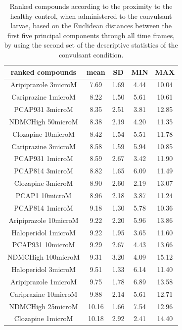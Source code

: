 \documentclass[a4paper,12pt]{article}
\begin{document}
\begin{table}[h!]\tiny
\centering
\caption{Ranked compounds according to the proximity to the healthy control, when administered to the convulsant larvae, based on the Euclidean distances between the first five principal components through all time frames, by using the second set of the descriptive statistics of the convulsant condition.}
\begin{tabular}{|c|c|c|c|c|}
\hline
ranked compounds             & mean & SD   & MIN  & MAX   \\ \hline
Aripiprazole 3microM  & 7.69  & 1.69 & 4.44 & 10.04 \\ \hline
Cariprazine 1microM   & 8.22  & 1.50  & 5.61 & 10.61 \\ \hline
PCAP931 3microM       & 8.35  & 2.51 & 3.81 & 12.85 \\ \hline
NDMCHigh 50microM     & 8.38  & 2.19 & 4.20  & 11.35 \\ \hline
Clozapine 10microM    & 8.42  & 1.54 & 5.51 & 11.78 \\ \hline
Cariprazine 3microM   & 8.58  & 1.59 & 5.94 & 10.85 \\ \hline
PCAP931 1microM       & 8.59  & 2.67 & 3.42 & 11.90  \\ \hline
PCAP814 3microM       & 8.82  & 1.65 & 6.09 & 11.49 \\ \hline
Clozapine 3microM     & 8.90   & 2.60  & 2.19 & 13.07 \\ \hline
PCAP1 10microM        & 8.96  & 2.18 & 3.87 & 11.24 \\ \hline
PCAP814 1microM       & 9.18  & 1.30  & 5.78 & 10.36 \\ \hline
Aripiprazole 10microM & 9.22  & 2.20  & 5.96 & 13.86 \\ \hline
Haloperidol 1microM   & 9.22  & 1.95 & 3.65 & 11.60  \\ \hline
PCAP931 10microM      & 9.29  & 2.67 & 4.43 & 13.66 \\ \hline
NDMCHigh 100microM    & 9.31  & 3.20  & 4.09 & 15.12 \\ \hline
Haloperidol 3microM   & 9.51  & 1.33 & 6.14 & 11.40  \\ \hline
Aripiprazole 1microM  & 9.75  & 1.78 & 6.89 & 13.58 \\ \hline
Cariprazine 10microM  & 9.88  & 2.14 & 5.61 & 12.71 \\ \hline
NDMCHigh 25microM     & 10.16 & 1.66 & 7.54 & 12.96 \\ \hline
Clozapine 1microM     & 10.18 & 2.92 & 2.41 & 14.40  \\ \hline

\end{tabular}
\end{table}
\end{document}
